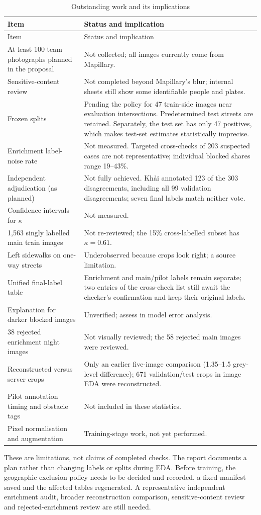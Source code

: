 \begin{longtable}{p{} p{}}
\caption{Outstanding work and its implications}\label{en:notdone}\\\toprule
Item & Status and implication \\\midrule\endfirsthead
\toprule Item & Status and implication \\\midrule\endhead
At least 100 team photographs planned in the proposal & Not collected; all images currently come from Mapillary. \\
Sensitive-content review & Not completed beyond Mapillary's blur; internal sheets still show some identifiable people and plates. \\
Frozen splits & Pending the policy for 47 train-side images near evaluation intersections. Predetermined test streets are retained. Separately, the test set has only 47 positives, which makes test-set estimates statistically imprecise. \\
Enrichment label-noise rate & Not measured. Targeted cross-checks of 203 suspected cases are not representative; individual blocked shares range 19--43\%. \\
Independent adjudication (as planned) & Not fully achieved. Khải annotated 123 of the 303 disagreements, including all 99 validation disagreements; seven final labels match neither vote. \\
Confidence intervals for $\kappa$ & Not measured. \\
1,563 singly labelled main train images & Not re-reviewed; the 15\% cross-labelled subset has $\kappa=0.61$. \\
Left sidewalks on one-way streets & Underobserved because crops look right; a source limitation. \\
Unified final-label table & Enrichment and main/pilot labels remain separate; two entries of the cross-check list still await the checker's confirmation and keep their original labels. \\
Explanation for darker blocked images & Unverified; assess in model error analysis. \\
38 rejected enrichment night images & Not visually reviewed; the 58 rejected main images were reviewed. \\
Reconstructed versus server crops & Only an earlier five-image comparison (1.35--1.5 grey-level difference); 671 validation/test crops in image EDA were reconstructed. \\
Pilot annotation timing and obstacle tags & Not included in these statistics. \\
Pixel normalisation and augmentation & Training-stage work, not yet performed. \\\bottomrule
\end{longtable}
These are limitations, not claims of completed checks. The report documents a plan rather than changing labels or splits during EDA. Before training, the geographic exclusion policy needs to be decided and recorded, a fixed manifest saved and the affected tables regenerated. A representative independent enrichment audit, broader reconstruction comparison, sensitive-content review and rejected-enrichment review are still needed.

